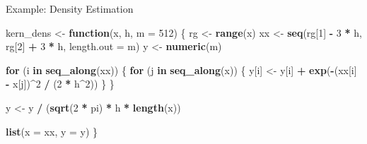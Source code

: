 \documentclass[
  ignorenonframetext,
  aspectratio=1610,
  onlytextwidth]{beamer}
\newenvironment{Shaded}{\begin{snugshade}}{\end{snugshade}}
\newcommand{\AttributeTok}[1]{\textcolor[rgb]{0.13,0.29,0.53}{#1}}
\newcommand{\ControlFlowTok}[1]{\textcolor[rgb]{0.13,0.29,0.53}{\textbf{#1}}}
\newcommand{\DecValTok}[1]{\textcolor[rgb]{0.00,0.00,0.81}{#1}}
\newcommand{\FunctionTok}[1]{\textcolor[rgb]{0.13,0.29,0.53}{\textbf{#1}}}
\newcommand{\NormalTok}[1]{#1}
\newcommand{\OtherTok}[1]{\textcolor[rgb]{0.56,0.35,0.01}{#1}}
\newcommand{\SpecialCharTok}[1]{\textcolor[rgb]{0.81,0.36,0.00}{\textbf{#1}}}
\begin{document}
\begin{frame}[fragile]{Example: Density Estimation}
\label{example-density-estimation}
\begin{Shaded}
\begin{Highlighting}[]
\NormalTok{kern\_dens }\OtherTok{\textless{}{-}} \ControlFlowTok{function}\NormalTok{(x, h, }\AttributeTok{m =} \DecValTok{512}\NormalTok{) \{}
\NormalTok{  rg }\OtherTok{\textless{}{-}} \FunctionTok{range}\NormalTok{(x)}
\NormalTok{  xx }\OtherTok{\textless{}{-}} \FunctionTok{seq}\NormalTok{(rg[}\DecValTok{1}\NormalTok{] }\SpecialCharTok{{-}} \DecValTok{3} \SpecialCharTok{*}\NormalTok{ h, rg[}\DecValTok{2}\NormalTok{] }\SpecialCharTok{+} \DecValTok{3} \SpecialCharTok{*}\NormalTok{ h, }\AttributeTok{length.out =}\NormalTok{ m)}
\NormalTok{  y }\OtherTok{\textless{}{-}} \FunctionTok{numeric}\NormalTok{(m)}

  \ControlFlowTok{for}\NormalTok{ (i }\ControlFlowTok{in} \FunctionTok{seq\_along}\NormalTok{(xx)) \{}
    \ControlFlowTok{for}\NormalTok{ (j }\ControlFlowTok{in} \FunctionTok{seq\_along}\NormalTok{(x)) \{}
\NormalTok{      y[i] }\OtherTok{\textless{}{-}}\NormalTok{ y[i] }\SpecialCharTok{+} \FunctionTok{exp}\NormalTok{(}\SpecialCharTok{{-}}\NormalTok{(xx[i] }\SpecialCharTok{{-}}\NormalTok{ x[j])}\SpecialCharTok{\^{}}\DecValTok{2} \SpecialCharTok{/}\NormalTok{ (}\DecValTok{2} \SpecialCharTok{*}\NormalTok{ h}\SpecialCharTok{\^{}}\DecValTok{2}\NormalTok{))}
\NormalTok{    \}}
\NormalTok{  \}}

\NormalTok{  y }\OtherTok{\textless{}{-}}\NormalTok{ y }\SpecialCharTok{/}\NormalTok{ (}\FunctionTok{sqrt}\NormalTok{(}\DecValTok{2} \SpecialCharTok{*}\NormalTok{ pi) }\SpecialCharTok{*}\NormalTok{ h }\SpecialCharTok{*} \FunctionTok{length}\NormalTok{(x))}

  \FunctionTok{list}\NormalTok{(}\AttributeTok{x =}\NormalTok{ xx, }\AttributeTok{y =}\NormalTok{ y)}
\NormalTok{\}}
\end{Highlighting}
\end{Shaded}
\end{frame}
\end{document}
